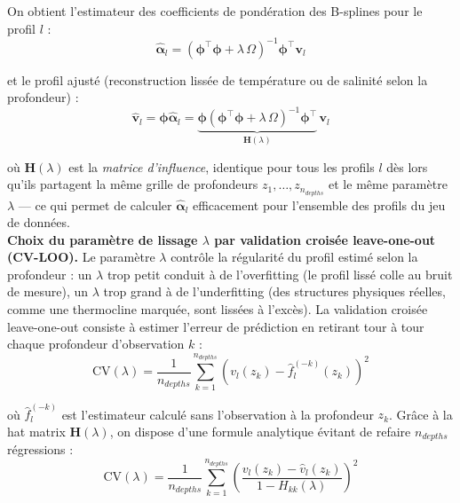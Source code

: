 \documentclass{article}
\begin{document}
	On obtient l'estimateur des coefficients de pondération des B-splines pour le profil $l$ :
	\begin{equation}
		\hat{\boldsymbol{\alpha}}_l = \left(\mathbf{\phi}^\top \mathbf{\phi} + 
		\lambda\, \Omega\right)^{-1} \mathbf{\phi}^\top \mathbf{v}_l
	\end{equation}
	
	et le profil ajusté (reconstruction lissée de température ou de salinité selon la profondeur) :
	\begin{equation}
		\hat{\mathbf{v}}_l = \mathbf{\phi}\hat{\boldsymbol{\alpha}}_l = 
		\underbrace{\mathbf{\phi}\left(\mathbf{\phi}^\top \mathbf{\phi} + 
			\lambda\, \Omega\right)^{-1} \mathbf{\phi}^\top}_{\mathbf{H}(\lambda)}\, \mathbf{v}_l
	\end{equation}
	
	où $\mathbf{H}(\lambda)$ est la \textit{matrice d'influence}, identique pour tous les profils $l$ dès lors qu'ils partagent la même grille de profondeurs $z_1,\ldots,z_{n_{depths}}$ et le même paramètre $\lambda$ — ce qui permet de calculer $\hat{\boldsymbol{\alpha}}_l$ efficacement pour l'ensemble des profils du jeu de données.\\
	
	\textbf{Choix du paramètre de lissage $\lambda$ par validation croisée 
		leave-one-out (CV-LOO).} Le paramètre $\lambda$ contrôle la régularité du profil estimé selon la profondeur : un $\lambda$ trop petit conduit à de l'overfitting (le profil lissé colle au bruit de mesure), 
	un $\lambda$ trop grand à de l'underfitting (des structures physiques réelles, comme une thermocline marquée, sont lissées à l'excès). La validation croisée 
	leave-one-out consiste à estimer l'erreur de prédiction en retirant tour 
	à tour chaque profondeur d'observation $k$ :
	\begin{equation}
		\text{CV}(\lambda) = \frac{1}{n_{depths}}\sum_{k=1}^{n_{depths}} 
		\left(v_l(z_k) - \hat{f}_l^{(-k)}(z_k)\right)^{2}
	\end{equation}
	
	où $\hat{f}_l^{(-k)}$ est l'estimateur calculé sans l'observation à la profondeur $z_k$. 
	Grâce à la hat matrix $\mathbf{H}(\lambda)$, on dispose d'une formule 
	analytique évitant de refaire $n_{depths}$ régressions :
	\begin{equation}
		\text{CV}(\lambda) = \frac{1}{n_{depths}}\sum_{k=1}^{n_{depths}} 
		\left(\frac{v_l(z_k) - \hat{v}_l(z_k)}{1 - H_{kk}(\lambda)}\right)^{2}
	\end{equation}
	
\end{document}
